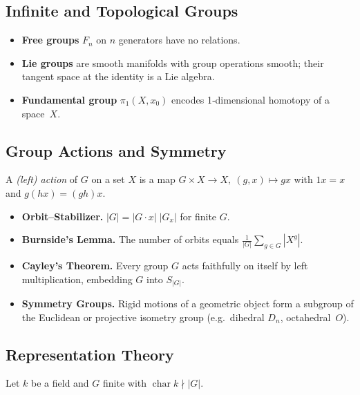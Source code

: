 \subsection{Infinite and Topological Groups}

\begin{itemize}
    \item \textbf{Free groups} \(F_{n}\) on \(n\) generators have no relations.
    \item \textbf{Lie groups} are smooth manifolds with group operations smooth;  
          their tangent space at the identity is a Lie algebra.
    \item \textbf{Fundamental group} \(\pi_{1}(X,x_{0})\) encodes 1‑dimensional homotopy of a space~\(X\).
\end{itemize}

\subsection{Group Actions and Symmetry}

A \emph{(left) action} of \(G\) on a set \(X\) is a map \(G\times X\to X,\ (g,x)\mapsto gx\) with  
\(1x=x\) and \(g(hx)=(gh)x\).  

\begin{itemize}
    \item \textbf{Orbit–Stabilizer.}  
          \(|G| = |G\!\cdot\!x|\;|G_{x}|\) for finite \(G\).
    \item \textbf{Burnside’s Lemma.}  
          The number of orbits equals \(\frac{1}{|G|}\sum_{g\in G}\!|X^{g}|\).
    \item \textbf{Cayley’s Theorem.}  
          Every group \(G\) acts faithfully on itself by left multiplication, embedding \(G\) into \(S_{|G|}\).
    \item \textbf{Symmetry Groups.}  
          Rigid motions of a geometric object form a subgroup of the Euclidean or projective isometry group (e.g.\ dihedral \(D_{n}\), octahedral~\(O\)).
\end{itemize}

\subsection{Representation Theory}

Let \(k\) be a field and \(G\) finite with \(\operatorname{char}k\nmid|G|\).

